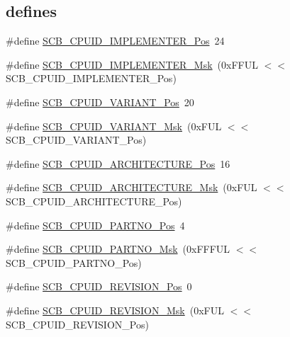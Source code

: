 \subsection*{\textquotesingle{}defines\textquotesingle{}}
\begin{DoxyCompactItemize}
\item 
\#define \hyperlink{group___c_m_s_i_s___s_c_b_ga58686b88f94f789d4e6f429fe1ff58cf}{S\+C\+B\+\_\+\+C\+P\+U\+I\+D\+\_\+\+I\+M\+P\+L\+E\+M\+E\+N\+T\+E\+R\+\_\+\+Pos}~24
\item 
\#define \hyperlink{group___c_m_s_i_s___s_c_b_ga0932b31faafd47656a03ced75a31d99b}{S\+C\+B\+\_\+\+C\+P\+U\+I\+D\+\_\+\+I\+M\+P\+L\+E\+M\+E\+N\+T\+E\+R\+\_\+\+Msk}~(0x\+F\+F\+U\+L $<$$<$ S\+C\+B\+\_\+\+C\+P\+U\+I\+D\+\_\+\+I\+M\+P\+L\+E\+M\+E\+N\+T\+E\+R\+\_\+\+Pos)
\item 
\#define \hyperlink{group___c_m_s_i_s___s_c_b_ga104462bd0815391b4044a70bd15d3a71}{S\+C\+B\+\_\+\+C\+P\+U\+I\+D\+\_\+\+V\+A\+R\+I\+A\+N\+T\+\_\+\+Pos}~20
\item 
\#define \hyperlink{group___c_m_s_i_s___s_c_b_gad358dfbd04300afc1824329d128b99e8}{S\+C\+B\+\_\+\+C\+P\+U\+I\+D\+\_\+\+V\+A\+R\+I\+A\+N\+T\+\_\+\+Msk}~(0x\+F\+U\+L $<$$<$ S\+C\+B\+\_\+\+C\+P\+U\+I\+D\+\_\+\+V\+A\+R\+I\+A\+N\+T\+\_\+\+Pos)
\item 
\#define \hyperlink{group___c_m_s_i_s___s_c_b_gaf8b3236b08fb8e840efb682645fb0e98}{S\+C\+B\+\_\+\+C\+P\+U\+I\+D\+\_\+\+A\+R\+C\+H\+I\+T\+E\+C\+T\+U\+R\+E\+\_\+\+Pos}~16
\item 
\#define \hyperlink{group___c_m_s_i_s___s_c_b_gafae4a1f27a927338ae9dc51a0e146213}{S\+C\+B\+\_\+\+C\+P\+U\+I\+D\+\_\+\+A\+R\+C\+H\+I\+T\+E\+C\+T\+U\+R\+E\+\_\+\+Msk}~(0x\+F\+U\+L $<$$<$ S\+C\+B\+\_\+\+C\+P\+U\+I\+D\+\_\+\+A\+R\+C\+H\+I\+T\+E\+C\+T\+U\+R\+E\+\_\+\+Pos)
\item 
\#define \hyperlink{group___c_m_s_i_s___s_c_b_ga705f68eaa9afb042ca2407dc4e4629ac}{S\+C\+B\+\_\+\+C\+P\+U\+I\+D\+\_\+\+P\+A\+R\+T\+N\+O\+\_\+\+Pos}~4
\item 
\#define \hyperlink{group___c_m_s_i_s___s_c_b_ga98e581423ca016680c238c469aba546d}{S\+C\+B\+\_\+\+C\+P\+U\+I\+D\+\_\+\+P\+A\+R\+T\+N\+O\+\_\+\+Msk}~(0x\+F\+F\+F\+U\+L $<$$<$ S\+C\+B\+\_\+\+C\+P\+U\+I\+D\+\_\+\+P\+A\+R\+T\+N\+O\+\_\+\+Pos)
\item 
\#define \hyperlink{group___c_m_s_i_s___s_c_b_ga3c3d9071e574de11fb27ba57034838b1}{S\+C\+B\+\_\+\+C\+P\+U\+I\+D\+\_\+\+R\+E\+V\+I\+S\+I\+O\+N\+\_\+\+Pos}~0
\item 
\#define \hyperlink{group___c_m_s_i_s___s_c_b_ga2ec0448b6483f77e7f5d08b4b81d85df}{S\+C\+B\+\_\+\+C\+P\+U\+I\+D\+\_\+\+R\+E\+V\+I\+S\+I\+O\+N\+\_\+\+Msk}~(0x\+F\+U\+L $<$$<$ S\+C\+B\+\_\+\+C\+P\+U\+I\+D\+\_\+\+R\+E\+V\+I\+S\+I\+O\+N\+\_\+\+Pos)
$$
\end{DoxyCompactItemize}
